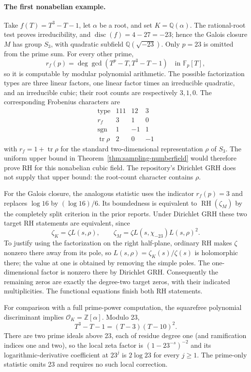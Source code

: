 \paragraph{The first nonabelian example.}
Take $f(T)=T^3-T-1$, let $\alpha$ be a root, and set
$K=\mathbb Q(\alpha)$. The rational-root test proves irreducibility,
and $\operatorname{disc}(f)=4-27=-23$; hence the Galois closure $M$
has group $S_3$, with quadratic subfield $\mathbb Q(\sqrt{-23})$.
Only $p=23$ is omitted from the prime sum. For every other prime,
\[
 r_f(p)=\deg\gcd(T^p-T,T^3-T-1)\quad\text{in }\mathbb F_p[T],
\]
so it is computable by modular polynomial arithmetic. The possible
factorization types are three linear factors, one linear factor times
an irreducible quadratic, and an irreducible cubic; their root counts
are respectively $3,1,0$. The corresponding Frobenius characters are
\[
 \begin{array}{c|ccc}
 \text{type}&111&12&3\\ \hline
 r_f&3&1&0\\
 \operatorname{sgn}&1&-1&1\\
 \operatorname{tr}\rho&2&0&-1
 \end{array}
\]
with $r_f=1+\operatorname{tr}\rho$ for the standard two-dimensional
representation $\rho$ of $S_3$. The uniform upper bound in
Theorem~\ref{thm:sampling-numberfield} would therefore prove RH for
this nonabelian cubic field. The repository's Dirichlet GRH does not
supply that upper bound: the root-count character contains $\rho$.

For the Galois closure, the analogous statistic uses the indicator
$r_f(p)=3$ and replaces $\log16$ by $(\log16)/6$. Its boundedness is
equivalent to $\operatorname{RH}(\zeta_M)$ by the completely split
criterion in the prior reports. Under Dirichlet GRH these two target
RH statements are equivalent, since
\[
 \zeta_K=\zeta L(s,\rho),\qquad
 \zeta_M=\zeta L(s,\chi_{-23})L(s,\rho)^2.
\]
To justify using the factorization on the right half-plane, ordinary
RH makes $\zeta$ nonzero there away from its pole, so
$L(s,\rho)=\zeta_K(s)/\zeta(s)$ is holomorphic there; the value at
one is obtained by removing the simple poles. The one-dimensional
factor is nonzero there by Dirichlet GRH. Consequently the remaining
zeros are exactly the degree-two target zeros, with their indicated
multiplicities. The functional equations finish both RH statements.

For comparison with a full prime-power computation, the squarefree
polynomial discriminant implies $\mathcal O_K=\mathbb Z[\alpha]$.
Modulo 23,
\[
 T^3-T-1=(T-3)(T-10)^2.
\]
There are two prime ideals above 23, each of residue degree one
(and ramification indices one and two), so the local zeta factor is
$(1-23^{-s})^{-2}$ and its logarithmic-derivative coefficient at
$23^j$ is $2\log23$ for every $j\ge1$. The prime-only statistic
omits 23 and requires no such local correction.

